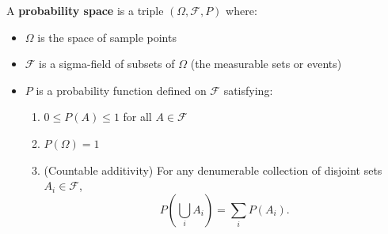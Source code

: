 A \textbf{probability space} is a triple $(\Omega, \mathcal{F}, P)$ where:
\begin{itemize}
\item $\Omega$ is the space of sample points
\item $\mathcal{F}$ is a sigma-field of subsets of $\Omega$ (the measurable sets or events)
\item $P$ is a probability function defined on $\mathcal{F}$ satisfying:
  \begin{enumerate}
  \item $0 \leq P(A) \leq 1$ for all $A \in \mathcal{F}$
  \item $P(\Omega) = 1$
  \item (Countable additivity) For any denumerable collection of disjoint sets $A_i \in \mathcal{F}$,
    $$P\left(\bigcup_i A_i\right) = \sum_i P(A_i).$$
  \end{enumerate}
\end{itemize}
